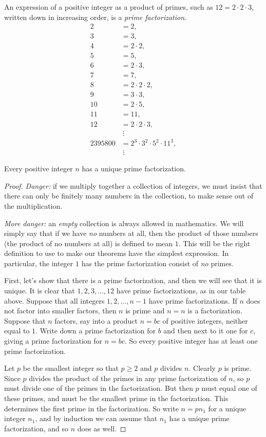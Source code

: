 An expression of a positive integer as a product of primes, such as \(12=2 \cdot 2 \cdot 3\), written down in increasing order, is a \emph{prime factorization}.
\marginpar
{\small
\begin{align*}
2 &= 2, \\
3 &= 3, \\
4 &= 2 \cdot 2, \\
5 &= 5, \\
6 &= 2 \cdot 3, \\
7 &= 7, \\
8 &= 2 \cdot 2 \cdot 2, \\
9 &= 3 \cdot 3, \\
10 &= 2 \cdot 5, \\
11 &= 11, \\
12 &= 2 \cdot 2 \cdot 3, \\
&\ \vdots \\
2395800 &= 2^3 \cdot 3^2 \cdot 5^2 \cdot 11^3, \\
&\ \vdots
\end{align*}
}
\begin{theorem}
Every positive integer \(n\) has a unique prime factorization.
\end{theorem}
\begin{proof}
\emph{Danger:} if we multiply together a collection of integers, we must insist that there can only be finitely many numbers in the collection, to make sense out of the multiplication.

\emph{More danger:} an \emph{empty} collection is always allowed in mathematics.
We will simply say that if we have \emph{no} numbers at all, then the product of those numbers (the product of no numbers at all) is defined to mean \(1\).
This will be the right definition to use to make our theorems have the simplest expression.
In particular, the integer \(1\) has the prime factorization consist of \emph{no} primes.

First, let's show that there is a prime factorization, and then we will see that it is unique.
It is clear that \(1, 2, 3, \dots, 12\) have prime factorizations, as in our table above.
Suppose that all integers \(1,2,\dots,n-1\) have prime factorizations.
If \(n\) does not factor into smaller factors, then \(n\) is prime and \(n=n\) is a factorization.
Suppose that \(n\) factors, say into a product \(n=bc\) of positive integers, neither equal to \(1\).
Write down a prime factorization for \(b\) and then next to it one for \(c\), giving a prime factorization for \(n=bc\).
So every positive integer has at least one prime factorization.

Let \(p\) be the smallest integer so that \(p \ge 2\) and \(p\) divides \(n\).
Clearly \(p\) is prime.
Since \(p\) divides the product of the primes in any prime factorization of \(n\), so \(p\) must divide one of the primes in the factorization.
But then \(p\) must equal one of these primes, and must be the smallest prime in the factorization.
This determines the first prime in the factorization. 
So write \(n=pn_1\) for a unique integer \(n_1\), and by induction we can assume that \(n_1\) has a unique prime factorization, and so \(n\) does as well.
\end{proof}

